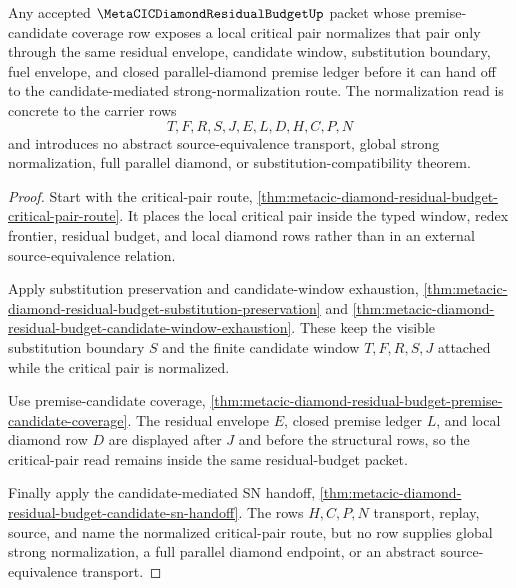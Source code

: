\begin{theorem}
\label{thm:metacic-diamond-residual-budget-critical-pair-residual-normalization}
Any accepted $\MetaCICDiamondResidualBudgetUp$ packet whose premise-candidate coverage row exposes a local critical pair normalizes that pair only through the same residual envelope, candidate window, substitution boundary, fuel envelope, and closed parallel-diamond premise ledger before it can hand off to the candidate-mediated strong-normalization route. The normalization read is concrete to the carrier rows
$$
T,F,R,S,J,E,L,D,H,C,P,N
$$
and introduces no abstract source-equivalence transport, global strong normalization, full parallel diamond, or substitution-compatibility theorem.
\end{theorem}
\begin{proof}
Start with the critical-pair route, \autoref{thm:metacic-diamond-residual-budget-critical-pair-route}. It places the local critical pair inside the typed window, redex frontier, residual budget, and local diamond rows rather than in an external source-equivalence relation.

Apply substitution preservation and candidate-window exhaustion, \autoref{thm:metacic-diamond-residual-budget-substitution-preservation} and \autoref{thm:metacic-diamond-residual-budget-candidate-window-exhaustion}. These keep the visible substitution boundary $S$ and the finite candidate window $T,F,R,S,J$ attached while the critical pair is normalized.

Use premise-candidate coverage, \autoref{thm:metacic-diamond-residual-budget-premise-candidate-coverage}. The residual envelope $E$, closed premise ledger $L$, and local diamond row $D$ are displayed after $J$ and before the structural rows, so the critical-pair read remains inside the same residual-budget packet.

Finally apply the candidate-mediated SN handoff, \autoref{thm:metacic-diamond-residual-budget-candidate-sn-handoff}. The rows $H,C,P,N$ transport, replay, source, and name the normalized critical-pair route, but no row supplies global strong normalization, a full parallel diamond endpoint, or an abstract source-equivalence transport.
\end{proof}

